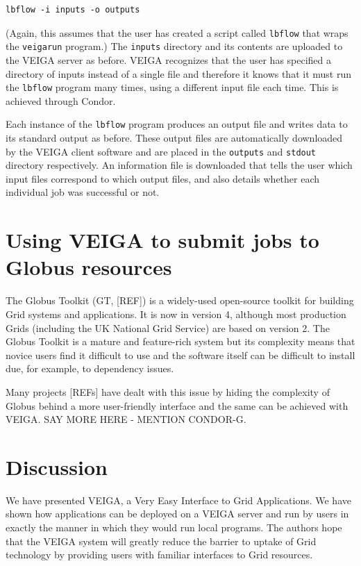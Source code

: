 \documentclass[a4paper]{article}
\begin{document}
\begin{multicols}{2}
\begin{verbatim}
lbflow -i inputs -o outputs
\end{verbatim}
(Again, this assumes that the user has created a script called {\tt lbflow} that wraps the {\tt veigarun} program.)  The {\tt inputs} directory and its contents are uploaded to the VEIGA server as before.  VEIGA recognizes that the user has specified a directory of inputs instead of a single file and therefore it knows that it must run the {\tt lbflow} program many times, using a different input file each time.  This is achieved through Condor.

Each instance of the {\tt lbflow} program produces an output file and writes data to its standard output as before.  These output files are automatically downloaded by the VEIGA client software and are placed in the {\tt outputs} and {\tt stdout} directory respectively.  An information file is downloaded that tells the user which input files correspond to which output files, and also details whether each individual job was successful or not.

\section{Using VEIGA to submit jobs to Globus resources}
The Globus Toolkit (GT, [REF]) is a widely-used open-source toolkit for building Grid systems and applications.  It is now in version 4, although most production Grids (including the UK National Grid Service) are based on version 2.  The Globus Toolkit is a mature and feature-rich system but its complexity means that novice users find it difficult to use and the software itself can be difficult to install due, for example, to dependency issues.

Many projects [REFs] have dealt with this issue by hiding the complexity of Globus behind a more user-friendly interface and the same can be achieved with VEIGA.  SAY MORE HERE - MENTION CONDOR-G.

\section{Discussion}
We have presented VEIGA, a Very Easy Interface to Grid Applications. We have shown how applications can be deployed on a VEIGA server and run by users in exactly the manner in which they would run local programs.  The authors hope that the VEIGA system will greatly reduce the barrier to uptake of Grid technology by providing users with familiar interfaces to Grid resources.


\end{multicols}
\end{document}

